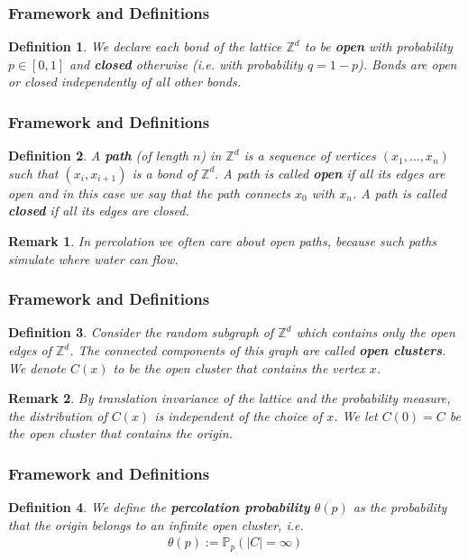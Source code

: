 \documentclass[compress,mathserif,serif]{beamer}
\newtheorem{dfn}{Definition}
\newtheorem{rem}{Remark}
\begin{document}
\begin{frame}
\frametitle{Framework and Definitions}
\begin{dfn}We declare each bond of the lattice $\mathbb{Z}^d$ to be \textbf{open} with probability $p \in [0,1]$ and \textbf{closed} otherwise (i.e. with probability $q=1-p$). Bonds are open or closed independently of all other bonds. 
\end{dfn}
\end{frame}

\begin{frame}
\frametitle{Framework and Definitions}
\begin{dfn}A \textbf{path} (of length $n$) in $\mathbb{Z}^d$ is a sequence of vertices $(x_1, \dots , x_n)$ such that $(x_i,x_{i+1})$ is a bond of $\mathbb{Z}^d.$ A path is called \textbf{open} if all its edges are open and in this case we say that the path connects $x_0$ with $x_n$. A path is called \textbf{closed} if all its edges are closed.
\end{dfn}
\pause
\begin{rem} In percolation we often care about open paths, because such paths simulate where water can flow. 
\end{rem}
\end{frame}

\begin{frame}
\frametitle{Framework and Definitions}
\begin{dfn}Consider the random subgraph of $\mathbb{Z}^d$ which contains only the open edges of $\mathbb{Z}^d$. The connected components of this graph are called \textbf{open clusters}. We denote $C(x)$ to be the open cluster that contains the vertex $x$. 
\end{dfn}
\pause
\begin{rem} By translation invariance of the lattice and the probability measure, the distribution of $C(x)$ is independent of the choice of $x$. We let $C(0)=C$ be the open cluster that contains the origin. 
\end{rem}
\end{frame}

\begin{frame}
\frametitle{Framework and Definitions}
\begin{dfn} We define the \textbf{percolation probability} $\theta(p)$ as the probability that the origin belongs to an infinite open cluster, i.e. 
\begin{align*}
\theta(p):= \mathbb{P}_p(|C|= \infty)
\end{align*} 
\end{dfn}
\end{frame}
\end{document}
